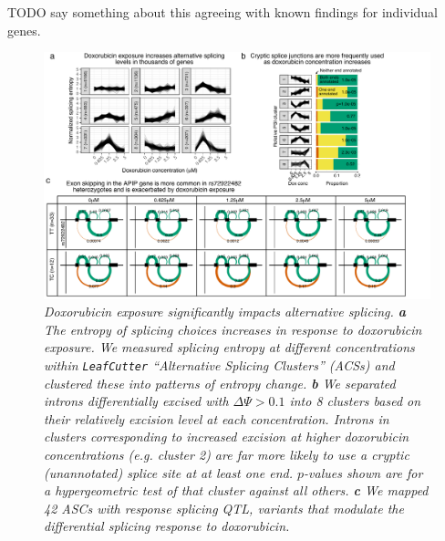 \documentclass{article}
\begin{document}
{TODO say something about this agreeing with known findings for individual genes.

\begin{figure}
\begin{center}
    \includegraphics[width=1\textwidth]{../figures/fig3_splicing.pdf}     \caption{\it{Doxorubicin exposure significantly impacts alternative splicing. \textbf{a} The entropy of splicing choices increases in response to doxorubicin exposure. We measured splicing entropy at different concentrations within \texttt{LeafCutter} ``Alternative Splicing Clusters'' (ACSs) and clustered these into patterns of entropy change. \textbf{b} We separated introns differentially excised with $\Delta \Psi > 0.1$ into 8 clusters based on their relatively excision level at each concentration. Introns in clusters corresponding to increased excision at higher doxorubicin concentrations (e.g. cluster 2) are far more likely to use a cryptic (unannotated) splice site at at least one end. $p$-values shown are for a hypergeometric test of that cluster against all others. \textbf{c} We mapped 42 ASCs with response splicing QTL, variants that modulate the differential splicing response to doxorubicin.}}
    \label{fig_splicing}
    \end{center}
\end{figure}

}
\end{document}
